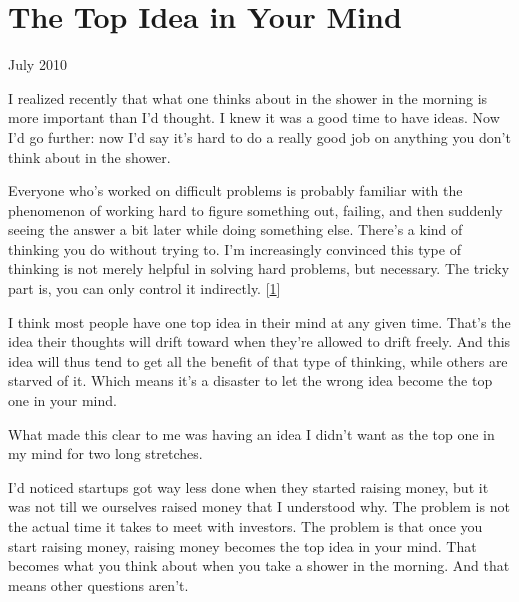\chapter{The Top Idea in Your Mind}


            
              
                


                  
                    July 2010

I realized recently that what one
                    thinks about in the shower in the morning is more important
                    than I'd thought. I knew it was a good time to have ideas.
                    Now I'd go further: now I'd say it's hard to do a really
                    good job on anything you don't think about in the shower.

Everyone
                    who's worked on difficult problems is probably familiar with
                    the phenomenon of working hard to figure something out,
                    failing, and then suddenly seeing the answer a bit later
                    while doing something else. There's a kind of thinking you
                    do without trying to. I'm increasingly convinced this type
                    of thinking is not merely helpful in solving hard problems,
                    but necessary. The tricky part is, you can only control it
                    indirectly.
                    [\href{\#f1n}{1}]

I think most people have one top idea in their
                    mind at any given time. That's the idea their thoughts will
                    drift toward when they're allowed to drift freely. And this
                    idea will thus tend to get all the benefit of that type of
                    thinking, while others are starved of it. Which means it's a
                    disaster to let the wrong idea become the top one in your
                    mind.

What made this clear to me was having an
                    idea I didn't want as the top one in my mind for two long
                    stretches.

I'd noticed startups got way less done
                    when they started raising money, but it was not till we
                    ourselves raised money that I understood why. The problem is
                    not the actual time it takes to meet with investors. The
                    problem is that once you start raising money, raising money
                    becomes the top idea in your mind. That becomes what you
                    think about when you take a shower in the morning. And that
                    means other questions aren't.

